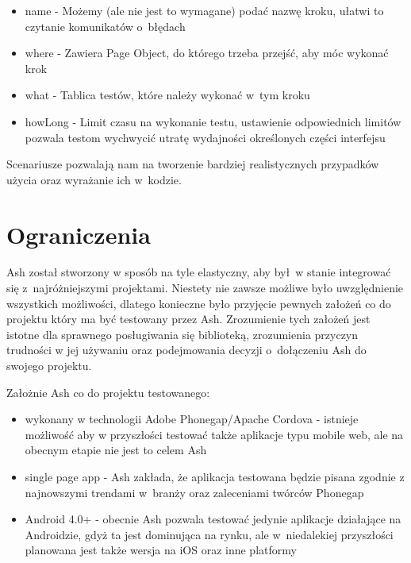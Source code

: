 \documentclass[brudnopis]{xmgr}
\begin{document}
\begin{itemize}
  \begin{itemize}
    \item name - Możemy (ale nie jest to wymagane) podać nazwę kroku, ułatwi to czytanie komunikatów o~błędach
    \item where - Zawiera Page Object, do którego trzeba przejść, aby móc wykonać krok 
    \item what - Tablica testów, które należy wykonać w~tym kroku
    \item howLong - Limit czasu na wykonanie testu, ustawienie odpowiednich limitów pozwala testom wychwycić utratę wydajności określonych części interfejsu
  \end{itemize}

Scenariusze pozwalają nam na tworzenie bardziej realistycznych przypadków użycia oraz wyrażanie ich w~kodzie. 

\end{itemize}

\section{Ograniczenia}

Ash został stworzony w sposób na tyle elastyczny, aby był~w stanie integrować się z~najróżniejszymi projektami. Niestety nie zawsze możliwe było uwzględnienie wszystkich możliwości, dlatego konieczne było przyjęcie pewnych założeń co do projektu który ma być testowany przez Ash. Zrozumienie tych założeń jest istotne dla sprawnego posługiwania się biblioteką, zrozumienia przyczyn trudności w jej używaniu oraz podejmowania decyzji o~dołączeniu Ash do swojego projektu.

Założnie Ash co do projektu testowanego:

\begin{itemize}
  \item wykonany w technologii Adobe Phonegap/Apache Cordova - istnieje możliwość aby w przyszłości testować także aplikacje typu mobile web, ale na obecnym etapie nie jest to celem Ash
  \item single page app - Ash zakłada, że aplikacja testowana będzie pisana zgodnie z najnowszymi trendami w~branży oraz zaleceniami twórców Phonegap
  \item Android 4.0+ - obecnie Ash pozwala testować jedynie aplikacje działające na Androidzie, gdyż ta jest dominująca na rynku, ale w~niedalekiej przyszłości planowana jest także wersja na iOS oraz inne platformy
\end{itemize}
\end{document}

